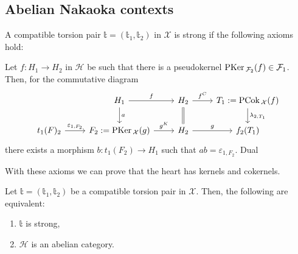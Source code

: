 \clearpage


\subsection{Abelian Nakaoka contexts}


\begin{definition}
  A compatible torsion pair $\mathbb{t}=(\mathbb{t}_1,\mathbb{t}_2)$ in $\mathcal{X}$
  is strong if the following axioms hold:
  \begin{torsionaxioms}
    \setcounter{enumi}{3}
    \item\label{ax:ct4} Let $f:H_1\to H_2$ in $\mathcal{H}$ be such that there is a pseudokernel
    $\mathrm{\textup{PKer\,}}_{\mathcal{F}_2}(f)\in\mathcal{F}_1$. Then, for the commutative diagram
    \begin{equation*}
      \begin{tikzcd}
        & H_1\arrow{d}{a}\arrow{r}{f}
          & H_2\arrow[equal]{d}\arrow{r}{f^C}
            & T_1:=\PCok_\mathcal{X}(f)\arrow{d}{\lambda_{2,T_1}}\\
        t_1(F)_2\arrow{r}{\varepsilon_{1,F_2}}
        & F_2:=\PKer_\mathcal{X}(g)\arrow{r}{g^K}
          & H_2\arrow{r}{g}
            & f_2(T_1)
      \end{tikzcd}
    \end{equation*}
    there exists a morphism $b:t_1(F_2)\to H_1$ such that $ab=\varepsilon_{1,F_2}$.
    \varitem{^\ast}\label{ax:ct4op} Dual
  \end{torsionaxioms}
\end{definition}

With these axioms we can prove that the heart has kernels and cokernels.

\begin{thm}
  Let $\mathbb{t}=(\mathbb{t}_1,\mathbb{t}_2)$ be a compatible torsion pair in $\mathcal{X}$. Then, the following are
  equivalent:
  \begin{enumerate}[label=(\alph*)]
    \item $\mathbb{t}$ is strong,
    \item $\mathcal{H}$ is an abelian category.
  \end{enumerate}
\end{thm}

